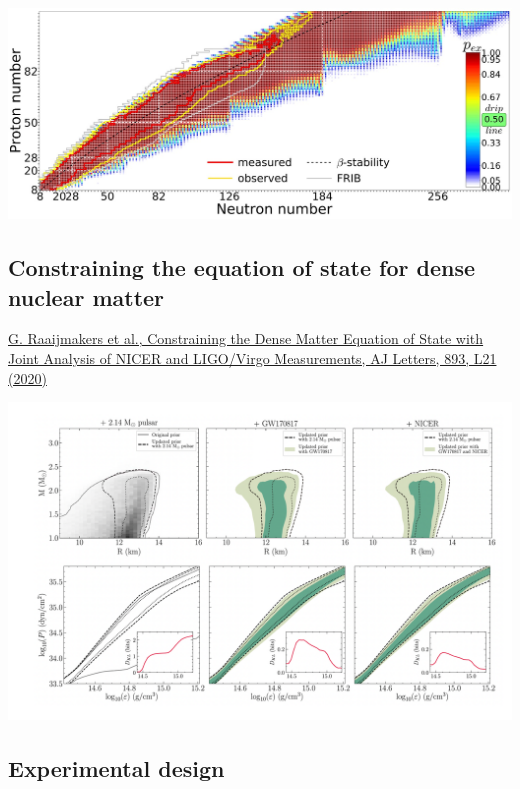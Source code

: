 \documentclass[%
oneside,                 %
final,                   %
10pt]{article}
\begin{document}
\vspace{6mm}

\centerline{\includegraphics[width=1.0\linewidth]{figures/landscape.jpg}}

\vspace{6mm}

\subsection{Constraining the equation of state for dense nuclear matter}

\href{{https://iopscience.iop.org/article/10.3847/2041-8213/ab822f}}{G. Raaijmakers et al., Constraining the Dense Matter Equation of State with Joint Analysis of NICER and LIGO/Virgo Measurements, AJ Letters, 893, L21 (2020)}

\vspace{6mm}

\centerline{\includegraphics[width=1.0\linewidth]{figures/nstareos.png}}

\vspace{6mm}

\subsection{Experimental design}
\end{document}
